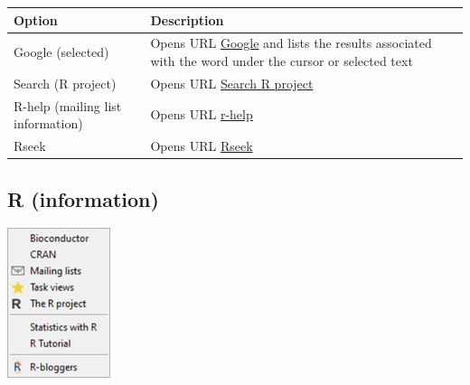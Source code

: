 \begin{scriptsize}
  \begin{tabularx}{\textwidth}{>{\hsize=0.5\hsize}X>{\hsize=0.7\hsize}X}\\
    \hline
    \textbf{Option} & \textbf{Description} \\
    \hline
    Google (selected) & Opens URL
     \href{http://www.google.com/webhp?domains=r-project.org\&sitesearch=r-project.org\&btnG=Google+Search}
     {Google} and lists the results associated with the word under the cursor or selected text \\
    Search (R project) & Opens URL \href{https://search.r-project.org/}{Search R project} \\
    \hdashline[1pt/1pt]
    R-help (mailing list information) & Opens URL
     \href{http://www.mail-archive.com/r-help@stat.math.ethz.ch/info.html}{r-help} \\
    Rseek & Opens URL \href{http://www.rseek.org/}{Rseek} \\
    \hline
  \end{tabularx}
\end{scriptsize}


\hypertarget{menu_web_rinformation}{}
\subsection{R (information)}

\includegraphics[scale=0.50]{./res/menu_web_rinformation.png}\\

